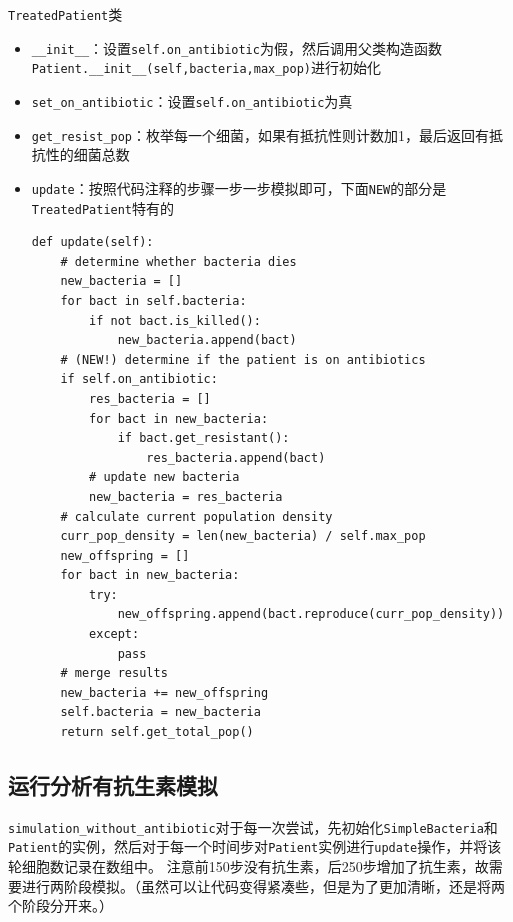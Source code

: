 \documentclass[logo,reportComp]{thesis}
\begin{document}
\verb'TreatedPatient'类
\begin{itemize}
	\item \verb'__init__'：设置\verb'self.on_antibiotic'为假，然后调用父类构造函数\verb'Patient.__init__(self,bacteria,max_pop)'进行初始化
	\item \verb'set_on_antibiotic'：设置\verb'self.on_antibiotic'为真
	\item \verb'get_resist_pop'：枚举每一个细菌，如果有抵抗性则计数加1，最后返回有抵抗性的细菌总数
	\item \verb'update'：按照代码注释的步骤一步一步模拟即可，下面\verb'NEW'的部分是\verb'TreatedPatient'特有的
\begin{lstlisting}
def update(self):
    # determine whether bacteria dies
    new_bacteria = []
    for bact in self.bacteria:
        if not bact.is_killed():
            new_bacteria.append(bact)
    # (NEW!) determine if the patient is on antibiotics
    if self.on_antibiotic:
        res_bacteria = []
        for bact in new_bacteria:
            if bact.get_resistant():
                res_bacteria.append(bact)
        # update new bacteria
        new_bacteria = res_bacteria
    # calculate current population density
    curr_pop_density = len(new_bacteria) / self.max_pop
    new_offspring = []
    for bact in new_bacteria:
        try:
            new_offspring.append(bact.reproduce(curr_pop_density))
        except:
            pass
    # merge results
    new_bacteria += new_offspring
    self.bacteria = new_bacteria
    return self.get_total_pop()
\end{lstlisting}
\end{itemize}

\subsection{运行分析有抗生素模拟}
\verb'simulation_without_antibiotic'对于每一次尝试，先初始化\verb'SimpleBacteria'和\verb'Patient'的实例，然后对于每一个时间步对\verb'Patient'实例进行\verb'update'操作，并将该轮细胞数记录在数组中。
注意前150步没有抗生素，后250步增加了抗生素，故需要进行两阶段模拟。（虽然可以让代码变得紧凑些，但是为了更加清晰，还是将两个阶段分开来。）
\end{document}
